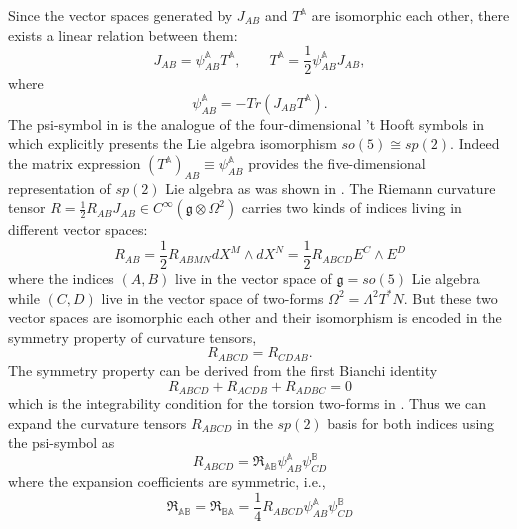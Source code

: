 \documentclass[12pt,epsf]{article}
\begin{document}
Since the vector spaces generated by $J_{AB}$ and $T^\mathbb{A}$ are isomorphic each other,
there exists a linear relation between them:
\begin{equation}\label{linear-rel}
  J_{AB} = \psi^\mathbb{A}_{AB} T^\mathbb{A},  \qquad T^\mathbb{A} = \frac{1}{2} \psi^\mathbb{A}_{AB} J_{AB},
\end{equation}
where
\begin{equation}\label{eta-symbol}
 \psi^\mathbb{A}_{AB} = - Tr (  J_{AB} T^\mathbb{A} ).
\end{equation}
The psi-symbol in  is the analogue of the four-dimensional 't Hooft symbols in 
which explicitly presents the Lie algebra isomorphism $so(5) \cong sp(2)$.
Indeed the matrix expression $(T^\mathbb{A})_{AB} \equiv \psi^\mathbb{A}_{AB}$ provides
the five-dimensional representation of $sp(2)$ Lie algebra as was shown in .
The Riemann curvature tensor $R = \frac{1}{2}  R_{AB} J_{AB} \in C^\infty ( \mathfrak{g} \otimes \Omega^2)$
carries two kinds of indices living in different vector spaces:
\begin{equation}\label{riemann-curvature}
  R_{AB} = \frac{1}{2} R_{ABMN} dX^M \wedge dX^N = \frac{1}{2} R_{ABCD} E^C \wedge E^D
\end{equation}
where the indices $(A,B)$ live in the vector space of $\mathfrak{g}=so(5)$ Lie algebra
while $(C,D)$ live in the vector space of two-forms $\Omega^2 = \Lambda^2 T^* N$.
But these two vector spaces are isomorphic each other and
their isomorphism is encoded in the symmetry property of curvature tensors,
\begin{equation}\label{symm-curv}
  R_{ABCD} = R_{CDAB}.
\end{equation}
The symmetry property  can be derived from the first Bianchi identity
\begin{equation}\label{1st-bianchi}
   R_{ABCD} + R_{ACDB} + R_{ADBC} = 0
\end{equation}
which is the integrability condition for the torsion two-forms in  \cite{egh-report,nakahara}.
Thus we can expand the curvature tensors $R_{ABCD}$ in the $sp(2)$ basis for both indices
using the psi-symbol  as
\begin{equation}\label{curv-eta}
  R_{ABCD} = \mathfrak{R}_{\mathbb{A}\mathbb{B}} \psi^\mathbb{A}_{AB} \psi^\mathbb{B}_{CD}
\end{equation}
where the expansion coefficients are symmetric, i.e.,
\begin{equation}\label{r-symm}
\mathfrak{R}_{\mathbb{A}\mathbb{B}}
= \mathfrak{R}_{\mathbb{B}\mathbb{A}} = \frac{1}{4}  R_{ABCD} \psi^\mathbb{A}_{AB} \psi^\mathbb{B}_{CD}
\end{equation}
\end{document}
